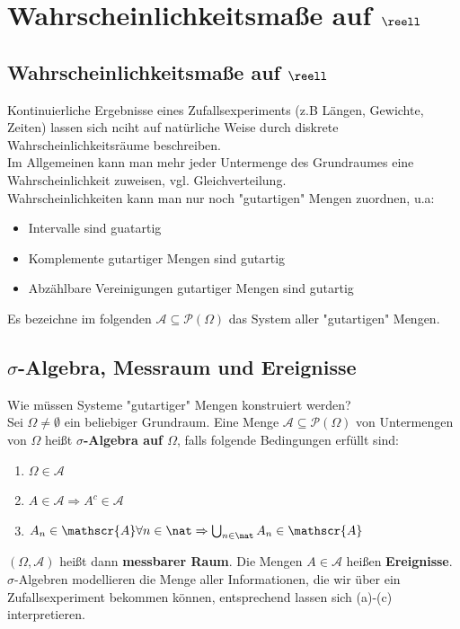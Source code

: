 \documentclass{kit}
\begin{document}
\section{Wahrscheinlichkeitsmaße auf \texorpdfstring{$\reell$}{}}
  \subsection{Wahrscheinlichkeitsmaße auf \texorpdfstring{$\reell$}{}}
    Kontinuierliche Ergebnisse eines Zufallsexperiments (z.B Längen, Gewichte, Zeiten) lassen sich nciht auf natürliche
    Weise durch diskrete Wahrscheinlichkeitsräume beschreiben.\\
    Im Allgemeinen kann man  mehr jeder Untermenge des Grundraumes eine Wahrscheinlichkeit zuweisen, vgl.
    Gleichverteilung.\\
    Wahrscheinlichkeiten kann man nur noch "gutartigen" Mengen zuordnen, u.a:
    \begin{itemize}
      \item Intervalle sind guatartig
      \item Komplemente gutartiger Mengen sind gutartig
      \item Abzählbare Vereinigungen gutartiger Mengen sind gutartig
    \end{itemize}
    Es bezeichne im folgenden $\mathscr{A}\subseteq\mathscr{P}(\Omega)$ das System aller "gutartigen" Mengen.
  \subsection{\texorpdfstring{$\sigma$}{}-Algebra, Messraum und Ereignisse}
    Wie müssen Systeme "gutartiger" Mengen konstruiert werden?\\
    Sei $\Omega\neq\emptyset$ ein beliebiger Grundraum. Eine Menge $\mathscr{A}\subseteq\mathscr{P}(\Omega)$ von
    Untermengen von $\Omega$ heißt \textbf{$\sigma$-Algebra auf $\Omega$}, falls folgende Bedingungen erfüllt sind:
    \begin{enumerate}
      \item $\Omega\in\mathscr{A}$
      \item $A\in\mathscr{A}\Rightarrow A^c\in\mathscr{A}$
      \item $A_n\in\mathscr{A}\forall n\in\nat\Rightarrow\bigcup_{n\in\nat}A_n\in\mathscr{A}$
    \end{enumerate}
    $(\Omega,\mathscr{A})$ heißt dann \textbf{messbarer Raum}. Die Mengen $A\in\mathscr{A}$ heißen \textbf{Ereignisse}.\\
    $\sigma$-Algebren modellieren die Menge aller Informationen, die wir über ein Zufallsexperiment bekommen können,
    entsprechend lassen sich (a)-(c) interpretieren.
\end{document}
